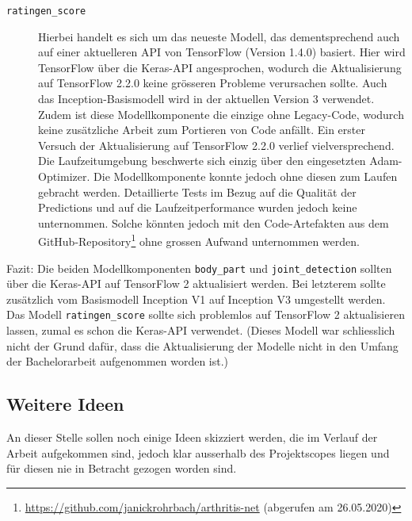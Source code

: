 \begin{description}
    \item [\texttt{ratingen\_score}] Hierbei handelt es sich um das neueste Modell, das dementsprechend auch auf einer aktuelleren API von TensorFlow (Version 1.4.0) basiert. Hier wird TensorFlow über die Keras-API angesprochen, wodurch die Aktualisierung auf TensorFlow 2.2.0 keine grösseren Probleme verursachen sollte. Auch das Inception-Basismodell wird in der aktuellen Version 3 verwendet. Zudem ist diese Modellkomponente die einzige ohne Legacy-Code, wodurch keine zusätzliche Arbeit zum Portieren von Code anfällt. Ein erster Versuch der Aktualisierung auf TensorFlow 2.2.0 verlief vielversprechend. Die Laufzeitumgebung beschwerte sich einzig über den eingesetzten Adam-Optimizer. Die Modellkomponente konnte jedoch ohne diesen zum Laufen gebracht werden. Detaillierte Tests im Bezug auf die Qualität der Predictions und auf die Laufzeitperformance wurden jedoch keine unternommen. Solche könnten jedoch mit den Code-Artefakten aus dem GitHub-Repository\footnote{\url{https://github.com/janickrohrbach/arthritis-net} (abgerufen am 26.05.2020)} ohne grossen Aufwand unternommen werden.
\end{description}

Fazit: Die beiden Modellkomponenten \texttt{body\_part} und \texttt{joint\_detection} sollten über die Keras-API auf TensorFlow 2 aktualisiert werden. Bei letzterem sollte zusätzlich vom Basismodell Inception V1 auf Inception V3 umgestellt werden. Das Modell \texttt{ratingen\_score} sollte sich problemlos auf TensorFlow 2 aktualisieren lassen, zumal es schon die Keras-API verwendet. (Dieses Modell war schliesslich nicht der Grund dafür, dass die Aktualisierung der Modelle nicht in den Umfang der Bachelorarbeit aufgenommen worden ist.)

\subsection{Weitere Ideen}
\label{sec:weitere-ideen}

An dieser Stelle sollen noch einige Ideen skizziert werden, die im Verlauf der Arbeit aufgekommen sind, jedoch klar ausserhalb des Projektscopes liegen und für diesen nie in Betracht gezogen worden sind.

